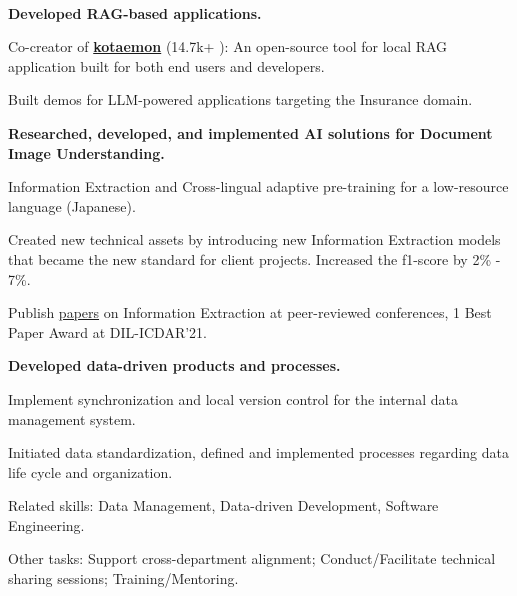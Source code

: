 \\
\vspace{-.2em}
\begin{xitemize}
    \item \textbf{Developed RAG-based applications.}
    \begin{zitemize}
\item Co-creator of \href{https://github.com/Cinnamon/kotaemon}{\textbf{kotaemon}}
(14.7k+ {\scriptsize \faStar}): An
        open-source tool for local RAG application built for both end users and developers.
        \item Built demos for LLM-powered applications targeting the Insurance domain.
    \end{zitemize}
    \item \textbf{Researched, developed, and implemented AI solutions for Document Image Understanding.}
    \begin{zitemize}
        \item Information Extraction and Cross-lingual adaptive pre-training for a
        low-resource language (Japanese).
        \item Created new technical assets by introducing new Information Extraction models that
        became the new standard for client projects. Increased the f1-score by 2\% - 7\%.
        \item Publish \href{https://scholar.google.com/citations?user=\gscholarid}{papers} on
        Information Extraction at peer-reviewed conferences, 1 Best Paper Award
        at DIL-ICDAR'21.
    \end{zitemize}
    \item \textbf{Developed data-driven products and processes.}
    \begin{zitemize}
        \item Implement synchronization and local version control for the internal
        data management system.
        \item Initiated data standardization, defined and implemented processes regarding data life cycle and organization.
        \item Related skills: Data Management, Data-driven Development, Software Engineering.
    \end{zitemize}
    \item Other tasks: Support cross-department alignment; Conduct/Facilitate technical sharing sessions; Training/Mentoring.
\end{xitemize}


